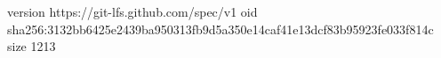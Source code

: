 version https://git-lfs.github.com/spec/v1
oid sha256:3132bb6425e2439ba950313fb9d5a350e14caf41e13dcf83b95923fe033f814c
size 1213
